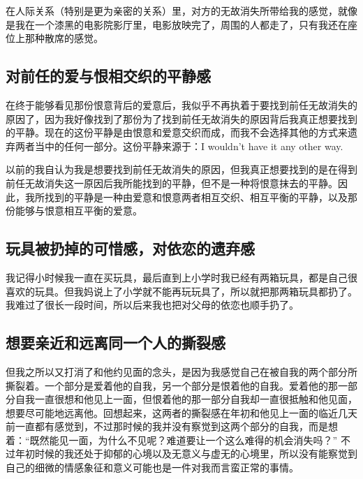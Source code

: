 在人际关系（特别是更为亲密的关系）里，对方的无故消失所带给我的感觉，就像是我在一个漆黑的电影院影厅里，电影放映完了，周围的人都走了，只有我还在座位上\pozhehao{}那种散席的感觉。




\subsection*{对前任的爱与恨相交织的平静感}

在终于能够看见那份恨意背后的爱意后，我似乎不再执着于要找到前任无故消失的原因了，因为我好像找到了那份为了找到前任无故消失的原因背后我真正想要找到的平静。现在的这份平静是由恨意和爱意交织而成，而我不会选择其他的方式来遗弃两者当中的任何一部分。这份平静来源于：I  wouldn't have it any other way.

以前的我自认为我是想要找到前任无故消失的原因，但我真正想要找到的是在得到前任无故消失这一原因后我所能找到的平静，但不是一种将恨意抹去的平静。因此，我所找到的平静是一种由爱意和恨意两者相互交织、相互平衡的平静，以及那份能够与恨意相互平衡的爱意。




\subsection*{玩具被扔掉的可惜感，对依恋的遗弃感}

我记得小时候我一直在买玩具，最后直到上小学时我已经有两箱玩具，都是自己很喜欢的玩具。但我妈说上了小学就不能再玩玩具了，所以就把那两箱玩具都扔了。我难过了很长一段时间，所以后来我也把对父母的依恋也顺手扔了。




\subsection*{想要亲近和远离同一个人的撕裂感}

但我之所以又打消了和他约见面的念头，是因为我感觉自己在被自我的两个部分所撕裂着。一个部分是爱着他的自我，另一个部分是恨着他的自我。爱着他的那一部分自我一直很想和他见上一面，但恨着他的那一部分自我却一直很抵触和他见面，想要尽可能地远离他。回想起来，这两者的撕裂感在年初和他见上一面的临近几天前一直都有感觉到，不过那时候的我并没有察觉到这两个部分的自我，而是想着：“既然能见一面，为什么不见呢？难道要让一个这么难得的机会消失吗？” 不过年初时候的我还处于抑郁的心境以及无意义与虚无的心境里，所以没有能察觉到自己的细微的情感象征和意义可能也是一件对我而言蛮正常的事情。

